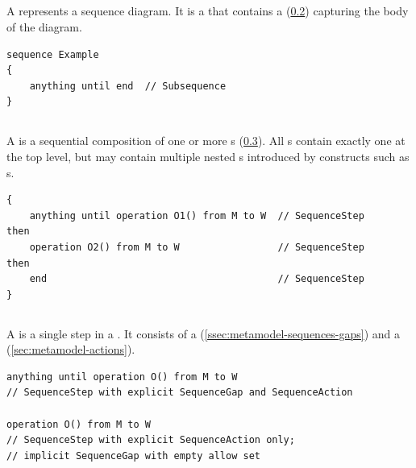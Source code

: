 \subsection{\msequence}\label{ssec:metamodel-sequences-sequences}

A \msequence{} represents a sequence diagram.  It is a \mnamedelement{}
that contains a \msubsequence{} (\cref{ssec:metamodel-sequences-subsequences})
capturing the body of the diagram.

\begin{lstlisting}[style=Example]
sequence Example
{
    anything until end  // Subsequence
}
\end{lstlisting}

\subsection{\msubsequence}\label{ssec:metamodel-sequences-subsequences}

A \msubsequence{} is a sequential composition of one or more \msequencestep s
(\cref{ssec:metamodel-sequences-steps}).
All \msequence s contain exactly one \msubsequence{} at the top level, but
may contain multiple nested \msubsequence s introduced by constructs such as
\mloopaction s.

\begin{lstlisting}[style=Example]
{
    anything until operation O1() from M to W  // SequenceStep
then
    operation O2() from M to W                 // SequenceStep
then
    end                                        // SequenceStep
}
\end{lstlisting}

\subsection{\msequencestep}\label{ssec:metamodel-sequences-steps}

A \msequencestep{} is a single step in a \msubsequence.  It consists of a
\msequencegap{} (\cref{ssec:metamodel-sequences-gaps}) and a
\msequenceaction{} (\cref{sec:metamodel-actions}).

\begin{lstlisting}[style=Example]
anything until operation O() from M to W
// SequenceStep with explicit SequenceGap and SequenceAction

operation O() from M to W
// SequenceStep with explicit SequenceAction only;
// implicit SequenceGap with empty allow set
\end{lstlisting}

